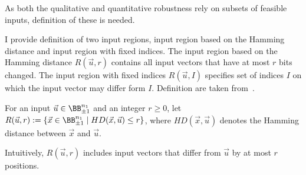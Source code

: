 As both the qualitative and quantitative robustness rely on subsets
of feasible inputs, definition of these is needed.

I provide definition of two input regions, input region based
on the Hamming distance and input region with fixed indices.
The input region based on the Hamming distance $R(\vec u, r)$ contains
all input vectors that have at most $r$ bits changed.
The input region with fixed indices $R(\vec u, I)$ specifies set of indices $I$
on which the input vector may differ form $I$.
Definition are taken from~\cite{zhang2021bdd4bnn}.

\begin{definition}
For an input $\vec u\in \BB^{n_1}_{\pm 1}$ and an integer $r \geq 0$,
let $R(\vec u, r) := \{\vec x\in \BB^{n_1}_{\pm 1} \mid HD(\vec x, \vec u) \leq r \}$, where $HD(\vec x, \vec u)$ denotes the Hamming distance
between $\vec x$ and $\vec u$.
\end{definition}

Intuitively, $R(\vec u, r)$ includes input vectors that differ from $\vec u$ by at most
$r$ positions.


